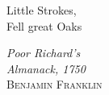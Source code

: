 \renewcommand{\epigraphsize}{\large}
\renewcommand{\textflush}{flushright}
\renewcommand{\sourceflush}{flushleft}
\setlength{\epigraphwidth}{0.3\textwidth}

\begin{vplace}
  \epigraph{
    Little Strokes,\\
    Fell great Oaks
  }{
    \textit{Poor Richard's\\Almanack, 1750}\\
    \textsc{Benjamin Franklin}
  }
\end{vplace}
